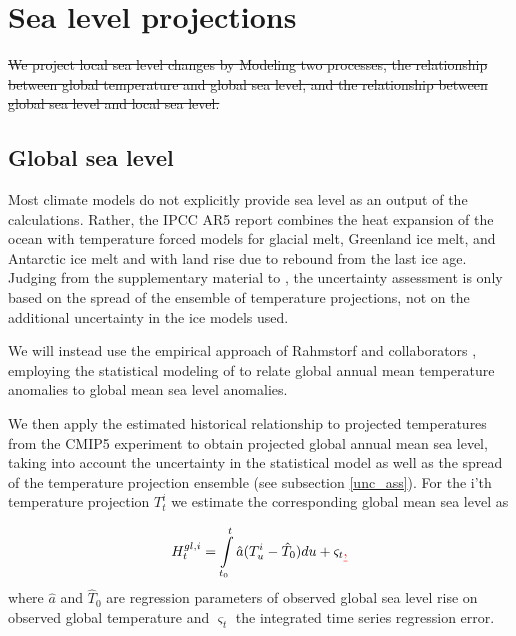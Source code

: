 \documentclass[draft,linenumbers]{agujournal}
\providecommand{\DIFadd}[1]{{\protect\color{blue}\uwave{#1}}} %
\providecommand{\DIFdel}[1]{{\protect\color{red}\sout{#1}}}                      %
\providecommand{\DIFaddbegin}{} %
\providecommand{\DIFaddend}{} %
\providecommand{\DIFdelbegin}{} %
\providecommand{\DIFdelend}{} %
\begin{document}
\section{Sea level projections \DIFaddbegin {\color{blue} \DIFadd{(PG)}}\DIFaddend }
\DIFaddbegin 

\DIFaddend \label{sealevelproj}

\DIFdelbegin \DIFdel{We project local sea level changes by Modeling two processes, the relationship between global temperature and global sea level, and the relationship between global sea level and local sea level.
}%

\DIFdelend \subsection{Global sea level}
Most climate models do not explicitly provide sea level as an output of the calculations. Rather, the IPCC AR5 report \citep[ch.~13]{ipcc} combines the heat expansion of the ocean with temperature forced models for glacial melt, Greenland ice melt, and Antarctic ice melt and with land rise due to rebound from the last ice age. Judging from the supplementary material to \citet[ch.~13]{ipcc}, the uncertainty assessment is only based on the spread of the ensemble of temperature projections, not on the additional uncertainty in the ice models used.

We will instead use the empirical approach of Rahmstorf and collaborators \citep{Rahmstorf07,Rahmstorf11}, employing the statistical modeling of \citet{Bolin2014a} to relate global annual mean temperature anomalies to global mean sea level anomalies. 


We then apply the estimated historical relationship to projected temperatures from the CMIP5 experiment \citep{cmip5} to obtain projected global annual mean sea level, taking into account the uncertainty in the statistical model as well as the spread of the temperature projection ensemble (see subsection \ref{unc_ass}). 
For the i'th temperature projection $T_t^i$ we estimate the corresponding global mean sea level as
\DIFdelbegin %
\DIFdelend \DIFaddbegin 

\DIFaddend \[H_t^{gl,i} = \int\limits_{{t_0}}^t {{\hat a} (T_u^i - {{\hat T}_0}} )du + {\varsigma _t}\DIFdelbegin \DIFdel{,}\DIFdelend \]
\DIFdelbegin %
\DIFdelend where ${\hat a}$ and ${\hat T}_0$ are regression parameters of observed global sea level  rise on observed global temperature and $\varsigma_t$ the integrated time series regression error.
\end{document}
